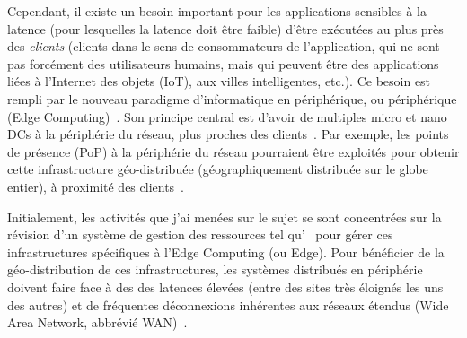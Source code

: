 Cependant, il existe un besoin important pour les applications
sensibles à la latence (pour lesquelles la latence doit être faible)
d'être exécutées au plus près des \emph{clients} (clients dans le sens
de consommateurs de l'application, qui ne sont pas forcément des
utilisateurs humains, mais qui peuvent être des applications liées à
l'Internet des objets (IoT), aux villes intelligentes, etc.).
%
Ce besoin est rempli par le nouveau paradigme d'informatique en
périphérique, ou périphérique (Edge Computing)~\cite{Sat17}.
%
Son principe central est d'avoir de multiples micro et nano DCs à la
périphérie du réseau, plus proches des clients~\cite{SCZ+16}.
%
Par exemple, les points de présence (PoP) à la périphérie du réseau
pourraient être exploités pour obtenir cette infrastructure
géo-distribuée (géographiquement distribuée sur le globe entier), à
proximité des clients~\cite{ELNC20}.



Initialement, les activités que j'ai menées sur le sujet se sont
concentrées sur la révision d'un système de gestion des ressources tel
qu'\os~\cite{os} pour gérer ces infrastructures spécifiques à l'Edge
Computing (ou Edge).
%
Pour bénéficier de la géo-distribution de ces infrastructures, les
systèmes distribués en périphérie doivent faire face à des des
latences élevées (entre des sites très éloignés les uns des autres) et
de fréquentes déconnexions inhérentes aux réseaux étendus
(Wide Area Network, abbrévié WAN)~\cite{Sat17, MISC+08}.









